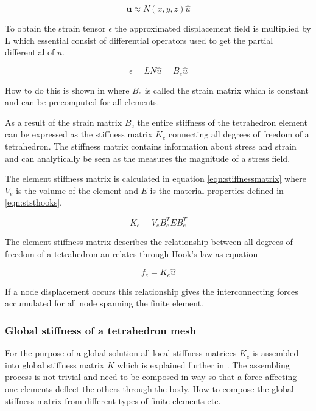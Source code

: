 \documentclass[10pt,a4paper]{article}
\begin{document}
\begin{equation}\label{nio}
    \mathbf{u} \approx N(x,y,z) \hat{u}
\end{equation}

To obtain the strain tensor $\epsilon$ the approximated displacement field is multiplied by L which essential consist of differential operators used to get the partial differential of $u$.

\begin{equation}\label{tio}
    \epsilon = LN \hat{u} = B_ {e} \hat{u}
\end{equation}

How to do this is shown in \cite{fem_liu} where $B_ {e}$ is called the strain matrix which is constant and can be precomputed for all elements.

As a result of the strain matrix $B_{e}$ the entire stiffness of the tetrahedron element can be expressed as the stiffness matrix $K_{e}$ connecting all degrees of freedom of a tetrahedron. The stiffness matrix contains information about stress and strain and can analytically be seen as the measures the magnitude of a stress field.

The element stiffness matrix is calculated in equation \ref{eqn:stiffnessmatrix} where $V_{e}$ is the volume of the element and $E$ is the material properties defined in \ref{eqn:ststhooks}.

\begin{equation}\label{eqn:stiffnessmatrix}
    K_{e} = V_{e} B_ {e}^{T}EB_ {e}^{T}
\end{equation}

The element stiffness matrix describes the relationship between all degrees of freedom of a tetrahedron an relates through Hook's law as equation

\begin{equation}\label{eqn:force}
    f_{e} = K_ {e}\hat{u}
\end{equation}

If a node displacement occurs this relationship gives the interconnecting forces accumulated for all node spanning the finite element.

\subsubsection{Global stiffness of a tetrahedron mesh}
For the purpose of a global solution all local stiffness matrices $K_{e}$ is assembled into global stiffness matrix $K$ which is explained further in \cite{muller_ivm}. The assembling process is not trivial and need to be composed in way so that a force affecting one elements deflect the others through the body. How to compose the global stiffness matrix from different types of finite elements etc.
\end{document}
